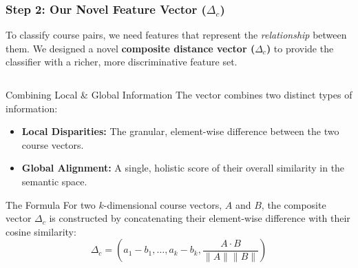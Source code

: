 \documentclass[aspectratio=169,10pt]{beamer}
\begin{document}
\begin{frame}
    \fontsize{9}{9}\selectfont
    \frametitle{Step 2: Our Novel Feature Vector (\(\Delta_c\))}

    To classify course pairs, we need features that represent the \textit{relationship} between them. We designed a novel \textbf{composite distance vector (\(\Delta_c\))} to provide the classifier with a richer, more discriminative feature set.

    \fontsize{9}{9}\selectfont
    \begin{columns}[T]
        \begin{column}{0.55\textwidth}
            \begin{block}{Combining Local \& Global Information}
                The vector combines two distinct types of information:
                \begin{itemize}
                    \item \textbf{Local Disparities:} The granular, element-wise difference between the two course vectors.
                    \item \textbf{Global Alignment:} A single, holistic score of their overall similarity in the semantic space.
                \end{itemize}
            \end{block}
            
            \begin{alertblock}{The Formula}
                For two \(k\)-dimensional course vectors, \(A\) and \(B\), the composite vector \(\Delta_c\) is constructed by concatenating their element-wise difference with their cosine similarity:
                \[ \Delta_{c} = \left( a_{1}-b_{1}, \dots, a_{k}-b_{k}, \frac{A \cdot B}{\parallel A \parallel\parallel B\parallel} \right) \]
            \end{alertblock}
        \end{column}


\end{columns}
\end{frame}
\end{document}
